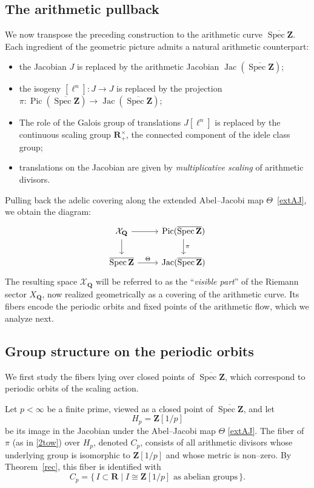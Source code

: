 \documentclass[11pt,a4paper]{article}
\newcommand{\Q}{\mathbf{Q}}
\newcommand{\Z}{\mathbf{Z}}
\newcommand{\R}{\mathbf{R}}
\def\spzb{\overline{\Spec \Z}}
\newcommand{\Spec}{\operatorname{Spec}}
\def\Pic{\operatorname{Pic}}
\def\Jac{\operatorname{Jac}}
\theoremstyle{plain}
\theoremstyle{definition} %
\begin{document}
\subsection{The arithmetic pullback}\label{arpull}

We now transpose the preceding construction to the arithmetic curve $\spzb$.
Each ingredient of the geometric picture admits a natural arithmetic counterpart:
\begin{itemize}[leftmargin=*, labelindent=0pt]
  \item[-] the Jacobian $J$ is replaced by the arithmetic Jacobian $\Jac(\spzb)$;
  \item[-] the isogeny $[\ell^n] : J \to J$ is replaced by the projection
        $\pi : \Pic(\spzb) \to \Jac(\spzb)$;
  \item[-] The role of the Galois group of translations $J[\ell^n]$ is replaced by the continuous scaling
        group $\R_+^\times$, the connected component of the idele class group;
  \item[-] translations on the Jacobian are given by \emph{multiplicative scaling} of
        arithmetic divisors.
\end{itemize}


Pulling back the adelic covering along the extended Abel--Jacobi map
$\Theta$~\eqref{extAJ}, we obtain the diagram:
\begin{equation}\label{2tow}
\begin{tikzcd}
\mathcal{X}_\Q \arrow[r] \arrow[d] & \Pic(\spzb) \arrow[d, "\pi"] \\
\spzb \arrow[r, "\Theta"] & \Jac(\spzb)
\end{tikzcd}
\end{equation}
The resulting space $\mathcal{X}_\Q$ will be referred to as the ``\emph{visible part}''
of the Riemann sector $X_\Q$, now realized geometrically as a covering of the
arithmetic curve.  Its fibers encode the periodic orbits and fixed points of the
arithmetic flow, which we analyze next.






\subsection{Group structure on the periodic orbits}

We first study the fibers lying over closed points of $\spzb$, which correspond
to periodic orbits of the scaling action.

Let $p < \infty$ be a finite prime, viewed as a closed point of $\spzb$, and let
\[
H_p = \Z[1/p]
\]
be its image in the Jacobian under the Abel--Jacobi map $\Theta$ \eqref{extAJ}.  The fiber of $\pi$ (as in \eqref{2tow}) over
$H_p$, denoted $C_p$, consists of all arithmetic divisors whose underlying group is
isomorphic to $\Z[1/p]$ and whose metric is non--zero.  By 
Theorem~\ref{rec}, this fiber is identified with
\[
C_p = \{\, I \subset \R \mid I \cong \Z[1/p] \text{ as abelian groups} \,\}.
\]
\end{document}
